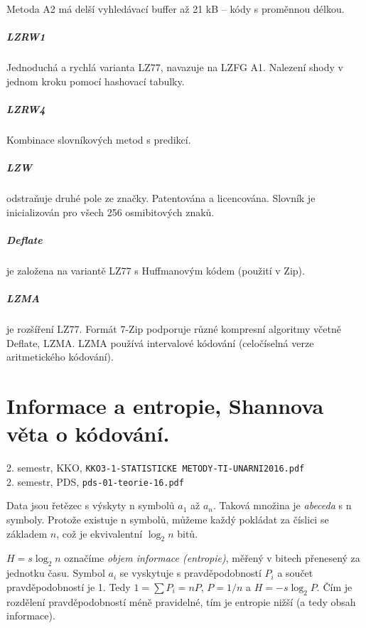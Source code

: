 \documentclass[a4paper, 11pt]{report}
\begin{document}
Metoda A2 má delší vyhledávací buffer až 21 kB -- kódy s proměnnou délkou.

\paragraph{LZRW1}
Jednoduchá a rychlá varianta LZ77, navazuje na LZFG A1. Nalezení shody v jednom kroku pomocí hashovací tabulky.

\paragraph{LZRW4}
Kombinace slovníkových metod s predikcí.

\paragraph{LZW}
odstraňuje druhé pole ze značky. Patentována a licencována. Slovník je inicializován pro všech 256 osmibitových znaků.

\paragraph{Deflate} je založena na variantě LZ77 s Huffmanovým kódem (použití v Zip).

\paragraph{LZMA} je rozšíření LZ77. Formát 7-Zip podporuje různé kompresní algoritmy včetně Deflate, LZMA. LZMA používá intervalové kódování (celočíselná verze aritmetického kódování).


\chapter{Informace a entropie, Shannova věta o kódování.} \label{cha:37}
2. semestr, KKO, \texttt{KKO3-1-STATISTICKE METODY-TI-UNARNI2016.pdf}\\
2. semestr, PDS, \texttt{pds-01-teorie-16.pdf}

Data jsou řetězec s výskyty n symbolů $a_1$ až $a_n$. Taková množina je \emph{abeceda} s n symboly. Protože existuje n symbolů, můžeme každý pokládat za číslici se základem $n$, což je ekvivalentní $\log_2 n$ bitů.

$H = s \log_2 n$ označíme \emph{objem informace (entropie)}, měřený v bitech přenesený za jednotku času. Symbol $a_i$ se vyskytuje s pravděpodobností $P_i$ a součet pravděpodobností je 1. Tedy $1=\sum P_i = nP$, $P = 1/n$ a $H = -s \log_2 P$. Čím je rozdělení pravděpodobností méně pravidelné, tím je entropie nižší (a tedy obsah informace).
\end{document}
